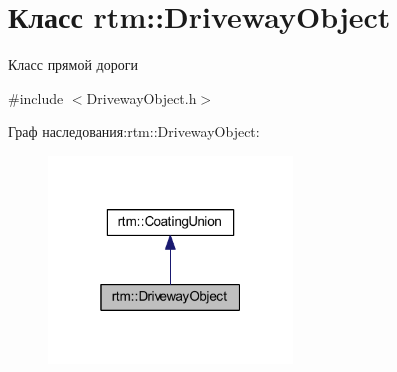 \hypertarget{classrtm_1_1_driveway_object}{}\section{Класс rtm\+:\+:Driveway\+Object}
\label{classrtm_1_1_driveway_object}


Класс прямой дороги  




{\ttfamily \#include $<$Driveway\+Object.\+h$>$}



Граф наследования\+:rtm\+:\+:Driveway\+Object\+:
\nopagebreak
\begin{figure}[H]
\begin{center}
\leavevmode
\includegraphics[width=184pt]{classrtm_1_1_driveway_object__inherit__graph}
\end{center}
\end{figure}
